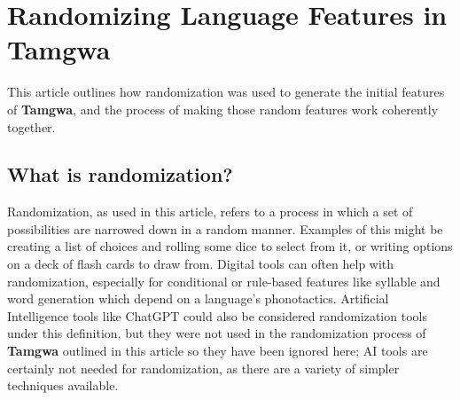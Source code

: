 \documentclass[a4paper,12pt,twoside,openright]{memoir}
\begin{document}


\chapter[Randomizing Language Features][Tamgwa]{Randomizing Language Features in Tamgwa}


\thispagestyle{fancy}
\BgUsetrue


    This article outlines how randomization was used to generate the initial features of \textbf{Tamgwa}, and the process of making those random features work coherently together.

\section*{What is randomization?} %

    Randomization, as used in this article, refers to a process in which a set of possibilities are narrowed down in a random manner.  Examples of this might be creating a list of choices and rolling some dice to select from it, or writing options on a deck of flash cards to draw from.  Digital tools can often help with randomization, especially for conditional or rule-based features like syllable and word generation which depend on a language's phonotactics.  Artificial Intelligence tools like ChatGPT could also be considered randomization tools under this definition, but they were not used in the randomization process of \textbf{Tamgwa} outlined in this article so they have been ignored here; AI tools are certainly not needed for randomization, as there are a variety of simpler techniques available.
\end{document}
